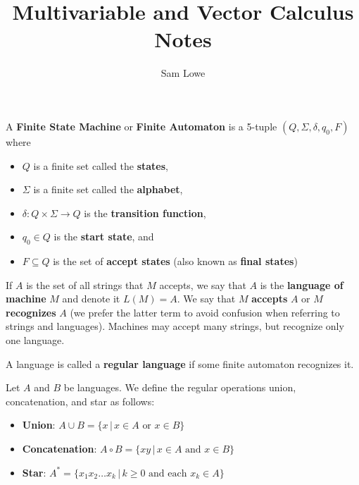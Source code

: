 \documentclass[12pt]{article}
\title{Multivariable and Vector Calculus Notes}
\author{Sam Lowe}
\begin{document}
\maketitle

\tableofcontents

\pagebreak


A \textbf{Finite State Machine} or \textbf{Finite Automaton} is a 5-tuple $(Q, \Sigma, \delta, q_0, F)$ where \begin{itemize}
    \item $Q$ is a finite set called the \textbf{states},
    \item $\Sigma$ is a finite set called the \textbf{alphabet},
    \item $\delta : Q \times \Sigma \to Q$ is the \textbf{transition function},
    \item $q_0 \in Q$ is the \textbf{start state}, and
    \item $F \subseteq Q$ is the set of \textbf{accept states} (also known as \textbf{final states})
\end{itemize}

If $A$ is the set of all strings that $M$ accepts, we say that $A$ is the \textbf{language of machine} $M$ and denote it $L(M)=A$. We say that $M$ \textbf{accepts} $A$ or $M$ \textbf{recognizes} $A$ (we prefer the latter term to avoid confusion when referring to strings and languages). Machines may accept many strings, but recognize only one language.

A language is called a \textbf{regular language} if some finite automaton recognizes it.

Let $A$ and $B$ be languages. We define the regular operations union, concatenation, and star as follows: \begin{itemize}
    \item \textbf{Union}: $A \cup B = \{ x \, | \, x \in A \text{ or } x \in B \}$
    \item \textbf{Concatenation}: $A \circ B = \{ xy \, | \, x \in A \text{ and } x \in B \}$
    \item \textbf{Star}: $A^* = \{ x_1x_2\ldots x_k \, | \, k \geq 0 \text{ and each } x_k \in A \}$ 
\end{itemize}
\end{document}
